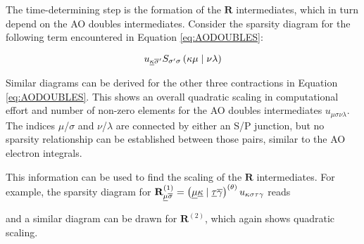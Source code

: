 The time-determining step is the formation of the $\mathbf{R}$ intermediates, which in turn depend on the AO doubles intermediates. Consider the sparsity diagram for the following term encountered in Equation \ref{eq:AODOUBLES}:

\begin{equation}
u_{\underline{\kappa}\overline{\sigma}'} S_{\sigma'\sigma} \left( \kappa \mu \mid \nu\lambda \right)
\end{equation}

\begin{center}
\end{center}
\noindent Similar diagrams can be derived for the other three contractions in Equation \ref{eq:AODOUBLES}. This shows an overall quadratic scaling in computational effort and number of non-zero elements for the AO doubles intermediates $u_{\mu\sigma\nu\lambda}$. The indices $\mu$/$\sigma$ and $\nu$/$\lambda$ are connected by either an S/P junction, but no sparsity relationship can be established between those pairs, similar to the AO electron integrals.  

This information can be used to find the scaling of the $\mathbf{R}$ intermediates. For example, the sparsity diagram for $\mathbf{R}_{\underline{\mu}\overline{\sigma}}^{(1)} = \left( \underline{\mu}\underline{\kappa} \mid \underline{\tau}\overline{\gamma} \right)^{(\theta)} u_{\kappa\sigma\tau\gamma}$ reads
\begin{center}
\end{center}
\noindent and a similar diagram can be drawn for $\mathbf{R}^{(2)}$, which again shows quadratic scaling. 

